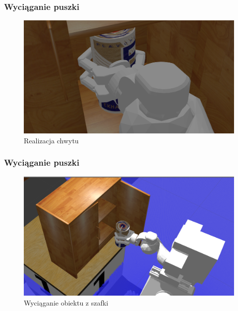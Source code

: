 \addtocounter{framenumber}{-1}
\begin{frame}
	\frametitle{Wyciąganie puszki}
	\begin{figure}[b]
        \label{sim_map}
        \centering
        \def\svgwidth{\columnwidth}
        \includegraphics[scale=0.25]{images/testpuszka/chwyt_zacisniety.png}
        \caption{Realizacja chwytu}
    \end{figure}
\end{frame}

\addtocounter{framenumber}{-1}
\begin{frame}
	\frametitle{Wyciąganie puszki}
	\begin{figure}[b]
        \label{sim_map}
        \centering
        \def\svgwidth{\columnwidth}
        \includegraphics[scale=0.25]{images/testpuszka/wyciagniecie_puszki.png}
        \caption{Wyciąganie obiektu z szafki}
    \end{figure}
\end{frame}


